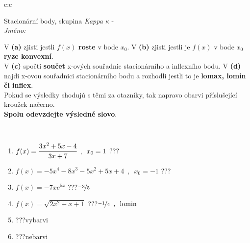 \documentclass[10pt]{report}
\begin{document}
\newpage
\thispagestyle{empty}
\begin{tabular}{c:c}
\begin{minipage}[c][104.5mm][t]{0.5\linewidth}
\begin{center}
\vspace{7mm}
{\huge Stacionární body, skupina \textit{Kappa $\kappa$} -}\\[5mm]
\textit{Jméno:}\phantom{xxxxxxxxxxxxxxxxxxxxxxxxxxxxxxxxxxxxxxxxxxxxxxxxxxxxxxxxxxxxxxxxx}\\[5mm]
\begin{minipage}{0.95\linewidth}
\begin{center}
{\small V \textbf{(a)} zjisti jestli $f(x)$ \textbf{roste} v bode $x_0$. V \textbf{(b)} zjisti jestli je $f(x)$ v bode $x_0$ \textbf{ryze konvexní}.\\V \textbf{(c)} spočti \textbf{součet} x-ových souřadnic stacionárního a inflexního bodu. V \textbf{(d)} najdi x-ovou souřadnici stacionárního bodu a rozhodli jestli to je \textbf{lomax, lomin či inflex}.\\Pokud se výsledky shodujú s těmi za otazníky, tak napravo obarvi příslušející kroužek načerno.\\\textbf{Spolu odevzdejte výsledné slovo}}.
\end{center}
\end{minipage}
\\[1mm]
\begin{minipage}{0.79\linewidth}
\begin{center}
\begin{varwidth}{\linewidth}
\begin{enumerate}
\normalsize
\item $f(x)=\cfrac{3x^2+5x-4}{3x+7}\enspace , \enspace x_0=1$\quad \dotfill\; ???\;\dotfill \quad {}
\item $f(x)=-5x^4-8x^3-5x^2+5x+4\enspace , \enspace x_0=-1$\quad \dotfill\; ???\;\dotfill \quad {}
\item $f(x)=-7xe^{5x}$\quad \dotfill\; ???\;\dotfill \quad $\nicefrac{-3}{5}$
\item $f(x)=\sqrt{2x^2+x+1}$\quad \dotfill\; ???\;\dotfill \quad $\nicefrac{-1}{4}\enspace , \enspace \mathrm{lomin}$
\item \quad \dotfill\; ???\;\dotfill \quad vybarvi
\item \quad \dotfill\; ???\;\dotfill \quad nebarvi
\end{enumerate}
\end{varwidth}
\end{center}

\end{minipage}
\end{center}
\end{minipage}
\end{tabular}
\end{document}
